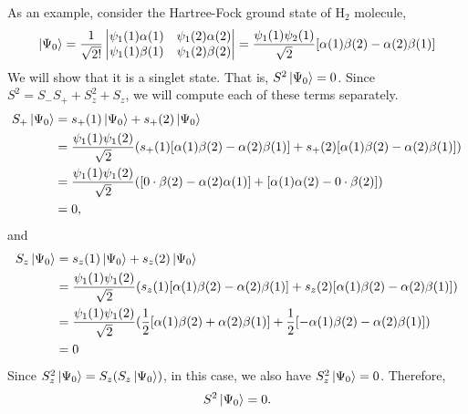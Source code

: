 As an example, consider the Hartree-Fock ground state of H$_2$ molecule,
\[
\ket{\Psi_0} = \frac{1}{\sqrt{2!}}\begin{vmatrix}
\psi_1(1)\alpha(1) & \psi_1(2)\alpha(2) \\
\psi_1(1)\beta(1) & \psi_1(2)\beta(2)
\end{vmatrix}
= \frac{\psi_1(1)\psi_2(1)}{\sqrt{2}}[\alpha(1)\beta(2) - \alpha(2)\beta(1)]
\]
We will show that it is a singlet state. That is, $S^2\ket{\Psi_0} = 0$. Since 
$S^2 = S_-S_+ + S_z^2 + S_z$, we will compute each of these terms separately.
\[
\begin{aligned}
S_+\ket{\Psi_0} &= s_+(1)\ket{\Psi_0} + s_+(2)\ket{\Psi_0} \\
 &= \frac{\psi_1(1)\psi_1(2)}{\sqrt{2}}(
    s_+(1)[\alpha(1)\beta(2) - \alpha(2)\beta(1)] + 
    s_+(2)[\alpha(1)\beta(2) - \alpha(2)\beta(1)]) \\
 &= \frac{\psi_1(1)\psi_1(2)}{\sqrt{2}}([0\cdot\beta(2) - \alpha(2)\alpha(1)]
    + [\alpha(1)\alpha(2) - 0\cdot\beta(2)]) \\
 &= 0,
\end{aligned}
\]
and
\[
\begin{aligned}
S_z\ket{\Psi_0} &= s_z(1)\ket{\Psi_0} + s_z(2)\ket{\Psi_0} \\
 &= \frac{\psi_1(1)\psi_1(2)}{\sqrt{2}}(
    s_z(1)[\alpha(1)\beta(2) - \alpha(2)\beta(1)] + 
    s_z(2)[\alpha(1)\beta(2) - \alpha(2)\beta(1)]) \\
 &= \frac{\psi_1(1)\psi_1(2)}{\sqrt{2}}(
    \frac{1}{2}[\alpha(1)\beta(2) + \alpha(2)\beta(1)] + 
    \frac{1}{2}[-\alpha(1)\beta(2) - \alpha(2)\beta(1)]) \\
 &= 0
\end{aligned}
\]
Since $S_z^2\ket{\Psi_0} = S_z(S_z\ket{\Psi_0})$, in this case, we also have
$S_z^2\ket{\Psi_0} = 0$. Therefore,
\begin{equation}\label{c2e162}
S^2\ket{\Psi_0} = 0.
\end{equation}

